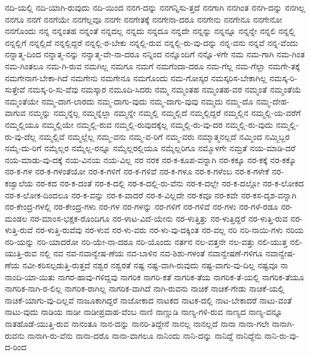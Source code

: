 {ನದಿ-ಯಲ್ಲಿ
ನದಿ-ಯಾಗಿ-ರುವುದು
ನದಿ-ಯಿಂದ
ನನಗ-ದನ್ನು
ನನಗನ್ನಿಸು-ತ್ತದೆ
ನನಗಾಗಿ
ನನಗಿಂತ
ನನಗಿ-ದನ್ನು
ನನಗಿಲ್ಲ
ನನಗೂ
ನನಗೆ
ನನಗೆಯೇ
ನನಗೆಲ್ಲವೂ
ನನಗೇ
ನನಗೇತಕ್ಕೆ
ನನಗೇನಾ-ದರೂ
ನನಗೇನು
ನನಗೇನೂ
ನನಗೇನೋ
ನನಗೊಂದು
ನನ್ನ
ನನ್ನಂತಹ
ನನ್ನಂತೆ
ನನ್ನದಲ್ಲ
ನನ್ನದು
ನನ್ನದೂ
ನನ್ನದೇ
ನನ್ನನ್ನು
ನನ್ನನ್ನೂ
ನನ್ನನ್ನೇ
ನನ್ನಲಿ
ನನ್ನಲ್ಲಿ
ನನ್ನಲ್ಲಿಗೆ
ನನ್ನಲ್ಲಿದೆ
ನನ್ನಲ್ಲಿದ್ದರೆ
ನನ್ನಲ್ಲಿ-ರ-ಬೇಕು
ನನ್ನಲ್ಲಿ-ರುವ
ನನ್ನಲ್ಲಿ-ರು-ವು-ದನ್ನು
ನನ್ನ-ವನು
ನನ್ನವೆ
ನನ್ನ-ವೆಂದು
ನನ್ನಾತ್ಮ-ದಿಂದ
ನನ್ನಾತ್ಮ-ನನ್ನು
ನನ್ನಾತ್ಮ-ವೇ-ನಾ-ದರೂ
ನನ್ನಿಂದ
ನನ್ನೊಂದಿಗೆ
ನನ್ನೊ-ಳಗೇ
ನಮ
ನಮ-ಗಾಗಿ
ನಮ-ಗಿಂತ
ನಮ-ಗಿಂತಲೂ
ನಮ-ಗಿ-ರುವ
ನಮಗಿಲ್ಲ
ನಮಗೂ
ನಮಗೆ
ನಮಗೆಂದಾ-ದರೂ
ನಮ-ಗೆಲ್ಲ
ನಮ-ಗೆಲ್ಲಾ
ನಮಗೇ-ತಕ್ಕೆ
ನಮಗೇನಾಗ-ಬೇಕಾ-ಗಿದೆ
ನಮಗೇನು
ನಮಗೇನೂ
ನಮಗೊಂದು
ನಮ-ಗೋಸ್ಕರ
ನಮಸ್ಕರಿಸ-ಬೇಕಾಗಿಲ್ಲ
ನಮಸ್ಕ-ರಿ-ಸುತ್ತೇವೆ
ನಮಸ್ಕ-ರಿ-ಸು-ವೆವು
ನಮಸ್ಕಾರ
ನಮೂದಿ-ಸಿದರು
ನಮ್ಮ
ನಮ್ಮಂತಹ
ನಮ್ಮಂತಹ-ವರ
ನಮ್ಮಂತೆ
ನಮ್ಮಂತೆಯೆ
ನಮ್ಮಂತೆಯೇ
ನಮ್ಮ-ದಾಗ-ಲಾರದು
ನಮ್ಮ-ದಾಗು-ವುದು
ನಮ್ಮ-ದಾಗು-ವುವು
ನಮ್ಮದು
ನಮ್ಮ-ದೊ
ನಮ್ಮ-ದೇಹ-ವಾಗುವ
ನಮ್ಮನ್ನು
ನಮ್ಮನ್ನೆಲ್ಲ
ನಮ್ಮನ್ನೆಲ್ಲಾ
ನಮ್ಮನ್ನೇ
ನಮ್ಮಲ್ಲಿ
ನಮ್ಮಲ್ಲಿದೆ
ನಮ್ಮಲ್ಲಿದ್ದರೆ
ನಮ್ಮಲ್ಲಿನ
ನಮ್ಮಲ್ಲಿ-ಯ-ವರೆಗೆ
ನಮ್ಮಲ್ಲಿಯೂ
ನಮ್ಮಲ್ಲಿಯೇ
ನಮ್ಮಲ್ಲಿ-ರುವ
ನಮ್ಮಲ್ಲಿ-ರುವುದಕ್ಕೆಲ್ಲ
ನಮ್ಮಲ್ಲಿ-ರು-ವು-ದರ
ನಮ್ಮಲ್ಲಿ-ರು-ವುದು
ನಮ್ಮಲ್ಲಿ-ರು-ವು-ದೆಲ್ಲ
ನಮ್ಮಲ್ಲಿವೆ
ನಮ್ಮಲ್ಲೆಲ್ಲ
ನಮ್ಮ-ವನು
ನಮ್ಮ-ವ-ರಿಗೆ
ನಮ್ಮ-ವರು
ನಮ್ಮಾತ್ಮನಲ್ಲದೆ
ನಮ್ಮಿಂದ
ನಮ್ಮಿಬ್ಬರ
ನಮ್ಮೆ-ದು-ರಿಗೆ
ನಮ್ಮೆಲ್ಲರ
ನಮ್ಮೆಲ್ಲ-ರನ್ನೂ
ನಮ್ಮೆಲ್ಲರಲ್ಲಿಯೂ
ನಮ್ಮೆಲ್ಲರಿಗೂ
ನಮ್ಮೊಳಗೇ
ನಮ್ರತೆ
ನಯ-ಮಾಡಿ-ದರೆ
ನಯ-ಮಾಡು-ವು-ದಕ್ಕೆ
ನಯ-ವಿನಯ
ನಯ-ವಿಲ್ಲ
ನರ
ನರಕ
ನರ-ಕ-ಕೂಪ-ವನ್ನಾಗಿ
ನರ-ಕಕ್ಕೂ
ನರ-ಕಕ್ಕೆ
ನರ-ಕಕ್ಕೊ
ನರ-ಕ-ಗಳ
ನರ-ಕ-ಗಳಂತೆಯೋ
ನರ-ಕ-ಗಳಿಗೆ
ನರ-ಕ-ಗಳಿವೆ
ನರ-ಕ-ಗಳೂ
ನರ-ಕ-ಗಳೆಂಬ
ನರ-ಕ-ಗಳೇಕೆ
ನರ-ಕಜ್ವಾಲೆಯ
ನರ-ಕದ
ನರ-ಕ-ದಂತೆ
ನರ-ಕ-ದಲ್ಲಿ
ನರ-ಕ-ದಲ್ಲಿ-ರು-ವೆನು
ನರ-ಕ-ದಲ್ಲೇ
ನರ-ಕ-ದಲ್ಲೋ
ನರ-ಕ-ಲೋಕದ
ನರ-ಕ-ಲೋಕ-ದಿಂದಲೂ
ನರ-ಕ-ವನ್ನು
ನರ-ಕ-ವಾದರೆ
ನರ-ಕ-ವಿಲ್ಲದೇ
ನರ-ಕವೂ
ನರ-ಕವೇ
ನರ-ಕಸ-ದೃಶ-ವನ್ನಾಗಿ
ನರ-ಕೇಂದ್ರ-ಗಳಲ್ಲಿ
ನರ-ಕೇಂದ್ರ-ಗಳು
ನರ-ಗಳ
ನರ-ಗಳನ್ನು
ನರ-ಗಳಿಗೆ
ನರ-ಗಳಿವೆ
ನರ-ಗಳು
ನರ-ಗಳೆ-ರಡೂ
ನರ-ಮಂಡಲ
ನರ-ಮಾಂಸ-ಭಕ್ಷಕ-ರೊಂದಿಗೂ
ನರ-ಳಾಟ-ವಿದೆ-ಯೇನು
ನರ-ಳುತ್ತಿತ್ತು
ನರ-ಳುತ್ತಿದ್ದರೆ
ನರ-ಳುತ್ತಿ-ರುವ
ನರ-ಳುತ್ತಿ-ರುವೆ
ನರ-ಳುತ್ತಿ-ರುವೆವು
ನರ-ಳುವ
ನರ-ಳು-ವರು
ನರ-ಳು-ವು-ದಕ್ಕಿಂತ
ನರ-ವಲ್ಲ
ನರಿ
ನರಿ-ನಾಯಿ-ಗಳು
ನರಿಯ
ನರಿ-ಯನ್ನು
ನರಿ-ಯಾದರೋ
ನರಿ-ಯೇ-ನಾ-ದರೂ
ನರಿ-ಯೊಂದು
ನರ್ತನ
ನಲ-ವತ್ತನೇ
ನಲ-ವತ್ತು
ನಲಿ-ಯುತ್ತ
ನಲಿ-ಯುತ್ತಿ-ರುವ
ನಲ್ಲಿ
ನವ
ನವ-ನವಾನ್ವೇಷ-ಣೆಯ
ನವ-ಬಾಳಿನ
ನವ-ಶಿಶು-ಗಳಂತೆ
ನವಾನ್ವೇಷಣೆ-ಗಳಿಗೂ
ನವಾನ್ವೇಷ-ಣೆಯ
ನವೀ-ಕರಿಸಲ್ಪಡುತ್ತಿ-ರುತ್ತದೆ
ನಶ್ವರ
ನಶ್ವರತೆ
ನಷ್ಟ
ನಷ್ಟ-ವಾಗಿ-ರುವುದು
ನಷ್ಟ-ವಾಗು-ವು-ದಿಲ್ಲ
ನಷ್ಟವೂ
ನಾ
ನಾಂದಿ-ಯಾ-ಯಿತು
ನಾಗರ-ಹಾವು-ಗಳಿದ್ದವು
ನಾಗರಿಕ
ನಾಗರಿ-ಕತೆ
ನಾಗರಿಕ-ತೆಯ
ನಾಗರಿಕ-ತೆ-ಯಲ್ಲಿ
ನಾಗರಿಕ-ತೆಯೂ
ನಾಗರಿಕ-ನಾಗಿ-ರ-ಲಿಲ್ಲ
ನಾಗರಿಕ-ರಾಗಿಲ್ಲ
ನಾಗರಿಕ-ವಾಗಿದೆ
ನಾಗಿ-ರುವನು
ನಾಚಿಕೆ
ನಾಚಿಕೆ-ಗೇಡು
ನಾಚಿಕೆ-ಯಲ್ಲಿ
ನಾಚಿಕೆ-ಯಾಗು-ವು-ದಿಲ್ಲವೆ
ನಾಜೂಕಾಗಿದ್ದರೆ
ನಾಜೋಕಾದ
ನಾಟಕದ
ನಾಟಕ-ದಲ್ಲಿ
ನಾಟ-ಬೇಕಾದರೆ
ನಾಟು-ವಂತೆ
ನಾಟು-ವುದು
ನಾಡಿಯ
ನಾಡೀ
ನಾಡೀಪ್ರವಾಹ-ವೆಂಬ
ನಾಣಿ
ನಾಣ್ಣುಡಿ
ನಾಣ್ಯ-ಗಳಿ-ರುವ
ನಾಣ್ಯದ
ನಾಣ್ಯ-ವನ್ನೂ
ನಾತಹೊಡೆ-ಯುತ್ತಿ-ರುವ
ನಾನಂತೂ
ನಾನ-ದನ್ನು
ನಾನರಿ-ತಿದ್ದೇನೆ
ನಾನಲ್ಲ
ನಾನಲ್ಲದೆ
ನಾನಾ
ನಾನಾ-ಗಲೇ
ನಾನಾಗಿ-ರುವನು
ನಾನಾಗಿ-ರು-ವೆನು
ನಾನಾ-ದರೊ
ನಾನಾ-ವಾಗಲೂ
ನಾನಿಂದು
ನಾನಿ-ದನ್ನು
ನಾನಿದ್ದೆ
ನಾನಿದ್ದೆನು
ನಾನಿ-ರು-ವು-ದ-ರಿಂದ
}
